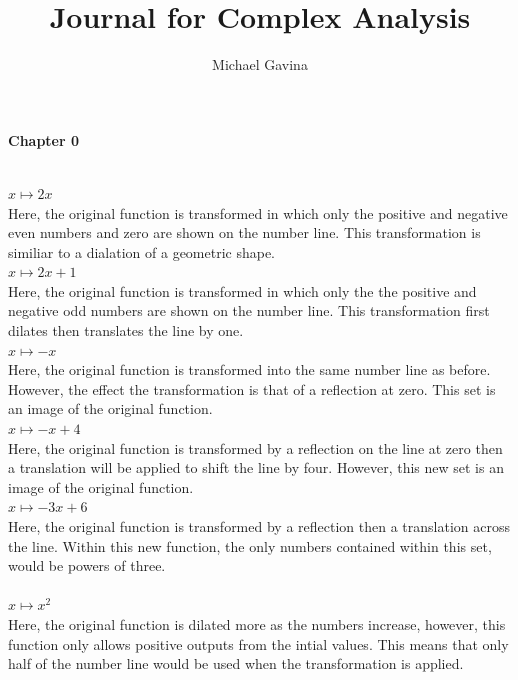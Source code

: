 \documentclass[12pt]{article}
\title{Journal for Complex Analysis}
\author{Michael Gavina}
\begin{document}
\maketitle

\begin{center}
\textbf{\large Chapter 0}
\end{center}

\\
$x \mapsto 2x$ \\
Here, the original function is transformed in which only the positive and negative even numbers and zero are shown on the number line. This transformation is similiar to a dialation of a geometric shape.
\\

$x \mapsto 2x + 1$ \\
Here, the original function is transformed in which only the the positive and negative odd numbers are shown on the number line. This transformation first dilates then translates the line by one.
\\

$x \mapsto -x$ \\
Here, the original function is transformed into the same number line as before. However, the effect the transformation is that of a reflection at zero. This set is an image of the original function. 
\\

$x \mapsto -x + 4$ \\
Here, the original function is transformed by a reflection on the line at zero then a translation will be applied to shift the line by four. However, this new set is an image of the original function. 
\\

$x \mapsto -3x + 6$ \\
Here, the original function is transformed by a reflection then a translation across the line. Within this new function, the only numbers contained within this set, would be powers of three.
\\

\\
$x \mapsto x^2$ \\
Here, the original function is dilated more as the numbers increase, however, this function only allows positive outputs from the intial values. This means that only half of the number line would be used when the transformation is applied.
\\
\end{document}
